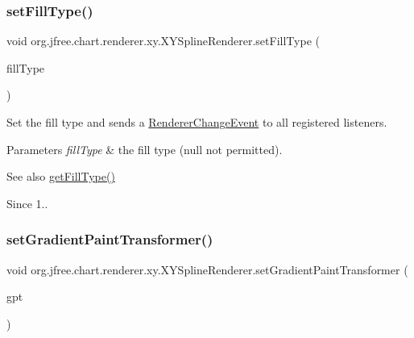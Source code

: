 \subsubsection{\texorpdfstring{set\+Fill\+Type()}{setFillType()}}
{\footnotesize\ttfamily void org.\+jfree.\+chart.\+renderer.\+xy.\+X\+Y\+Spline\+Renderer.\+set\+Fill\+Type (\begin{DoxyParamCaption}\item[{Fill\+Type}]{fill\+Type }\end{DoxyParamCaption})}

Set the fill type and sends a \mbox{\hyperlink{}{Renderer\+Change\+Event}} to all registered listeners.


\begin{DoxyParams}{Parameters}
{\em fill\+Type} & the fill type ({\ttfamily null} not permitted).\\
\hline
\end{DoxyParams}
\begin{DoxySeeAlso}{See also}
\mbox{\hyperlink{classorg_1_1jfree_1_1chart_1_1renderer_1_1xy_1_1_x_y_spline_renderer_ac8308a012d30b632a3a9c7b7627463a8}{get\+Fill\+Type()}}
\end{DoxySeeAlso}
\begin{DoxySince}{Since}
1.. 
\end{DoxySince}
\mbox{\label{classorg_1_1jfree_1_1chart_1_1renderer_1_1xy_1_1_x_y_spline_renderer_a8c5699db193f3d55ce98d9339a8fc676}} 
\subsubsection{\texorpdfstring{set\+Gradient\+Paint\+Transformer()}{setGradientPaintTransformer()}}
{\footnotesize\ttfamily void org.\+jfree.\+chart.\+renderer.\+xy.\+X\+Y\+Spline\+Renderer.\+set\+Gradient\+Paint\+Transformer (\begin{DoxyParamCaption}\item[{Gradient\+Paint\+Transformer}]{gpt }\end{DoxyParamCaption})}

